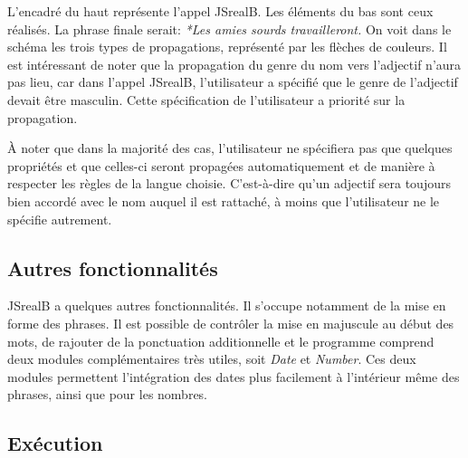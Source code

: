 \documentclass[11pt]{article} %
\newcommand{\system}[1]{\textsf{#1}}
\newcommand{\JSB}{\system{JSrealB}}
\newcommand{\real}[1]{\emph{#1}}
\begin{document}
L'encadré du haut représente l'appel \JSB{}. Les éléments du bas sont ceux
réalisés. La phrase finale serait: \real{*Les amies sourds travailleront.}
On voit dans le schéma les trois types de propagations, représenté
par les flèches de couleurs. Il est intéressant de noter que la propagation
du genre du nom vers l'adjectif n'aura pas lieu, car dans l'appel
\JSB{}, l'utilisateur a spécifié que le genre de l'adjectif devait
être masculin. Cette spécification de l'utilisateur a priorité sur
la propagation.

À noter que dans la majorité des cas, l'utilisateur ne spécifiera pas
que quelques propriétés et que celles-ci seront propagées automatiquement
et de manière à respecter les règles de la langue choisie. C'est-à-dire qu'un
adjectif sera toujours bien accordé avec le nom auquel il est rattaché, à moins
que l'utilisateur ne le spécifie autrement.

\subsection{Autres fonctionnalités}

\JSB{} a quelques autres fonctionnalités. Il s'occupe notamment de
la mise en forme des phrases. Il est possible de contrôler la mise
en majuscule au début des mots, de rajouter de la ponctuation additionnelle
et le programme comprend deux modules complémentaires très utiles,
soit \emph{Date} et \emph{Number}. Ces deux modules permettent l'intégration
des dates plus facilement à l'intérieur même des phrases, ainsi que
pour les nombres. 


\subsection{Exécution}
\label{subsec:exec}
\end{document}
